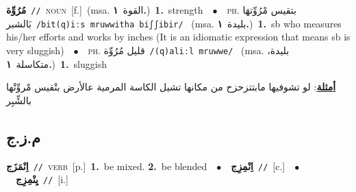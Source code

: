 \documentclass[10pt,a4paper,twoside]{article} %
\begin{document}
\begin{multicols}{2}
{\setlength\topsep{0pt}\textbf{\foreignlanguage{arabic}{مُرُوِّة}}\ {\color{gray}\texttt{//}\color{black}}\ \textsc{noun}\ [f.]\ \color{gray}(msa. \foreignlanguage{arabic}{القوة}~\foreignlanguage{arabic}{\textbf{١.}})\color{black}\ \textbf{1.}~strength\ \ $\bullet$\ \ \textsc{ph.} \color{gray} \foreignlanguage{arabic}{بتقيس مْرُوِّتهَا بَالشبر}\color{black}\ {\color{gray}\texttt{/{\sffamily bit(q)iːs mruwwitha biʃʃibir}/}\color{black}}\ \color{gray} (msa. \foreignlanguage{arabic}{بليدة}~\foreignlanguage{arabic}{\textbf{١.}})\color{black}\ \textbf{1.}~sb who measures his/her efforts and works by inches (It is an idiomatic expression that means sb is very sluggish)\ \ $\bullet$\ \ \textsc{ph.} \color{gray} \foreignlanguage{arabic}{قليل مُرُوِّة}\color{black}\ {\color{gray}\texttt{/{\sffamily (q)aliːl mruwwe}/}\color{black}}\ \color{gray} (msa. \foreignlanguage{arabic}{بليدة، متكاسلة}~\foreignlanguage{arabic}{\textbf{١.}})\color{black}\ \textbf{1.}~sluggish\  \begin{flushright}\color{gray}\foreignlanguage{arabic}{\textbf{\underline{\foreignlanguage{arabic}{أمثلة}}}: لو تشوفيها مابتتزحزح من مكانها تشيل الكاسة المرمية عالأرض بتْقيس مْروِّتْها بالشِّبِر}\end{flushright}\color{black}} \vspace{2mm}

\vspace{-3mm}
\subsection*{\color{blue}\foreignlanguage{arabic}{م.ز.ج}\color{blue}{}} 

{\setlength\topsep{0pt}\textbf{\foreignlanguage{arabic}{اِنْمَزَج}}\ {\color{gray}\texttt{//}\color{black}}\ \textsc{verb}\ [p.]\ \textbf{1.}~be mixed.  \textbf{2.}~be blended\ \ $\bullet$\ \ \setlength\topsep{0pt}\textbf{\foreignlanguage{arabic}{اِنْمِزِج}}\ {\color{gray}\texttt{//}\color{black}}\ [c.]\ \ $\bullet$\ \ \setlength\topsep{0pt}\textbf{\foreignlanguage{arabic}{يِنْمِزِج}}\ {\color{gray}\texttt{//}\color{black}}\ [i.]\ } \vspace{2mm}


\end{multicols}
\end{document}
